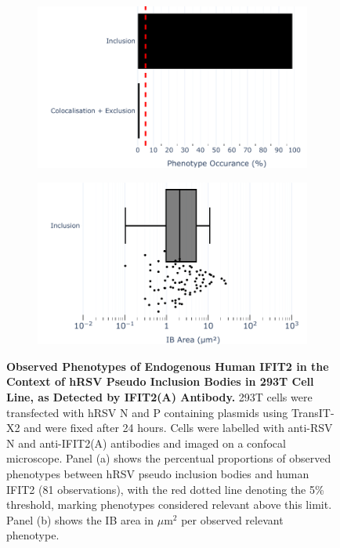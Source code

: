 \begin{figure}
    \begin{subfigure}{0.495\textwidth}
        \caption{}
        \includegraphics[width=1\linewidth]{09. Chapter 4/Figs/01. pIB/03. IFIT2/02. IFIT2A/01. bar_i2a_293t.pdf}
    \end{subfigure}
    \begin{subfigure}{0.495\textwidth}
        \caption{}
        \includegraphics[width=1\linewidth]{09. Chapter 4/Figs/01. pIB/03. IFIT2/02. IFIT2A/02. box_i2a_293t.pdf}
    \end{subfigure}
    \caption[Observed Phenotypes of Endogenous Human IFIT2 in the Context of hRSV Pseudo Inclusion Bodies in 293T Cell Line, as Detected by IFIT2(A) Antibody.]{\textbf{Observed Phenotypes of Endogenous Human IFIT2 in the Context of hRSV Pseudo Inclusion Bodies in 293T Cell Line, as Detected by IFIT2(A) Antibody.} 293T cells were transfected with hRSV N and P containing plasmids using TransIT-X2 and were fixed after 24 hours. Cells were labelled with anti-RSV N and anti-IFIT2(A) antibodies and imaged on a confocal microscope. Panel (a) shows the percentual proportions of observed phenotypes between hRSV pseudo inclusion bodies and human IFIT2 (81 observations), with the red dotted line denoting the 5\% threshold, marking phenotypes considered relevant above this limit. Panel (b) shows the IB area in \(\mu \mbox{m}^2\) per observed relevant phenotype.}
    \label{fig:Observed Phenotypes of Endogenous Human IFIT2 in the Context of hRSV Pseudo Inclusion Bodies in 293T Cell Line, as Detected by IFIT2(A) Antibody}
\end{figure}

